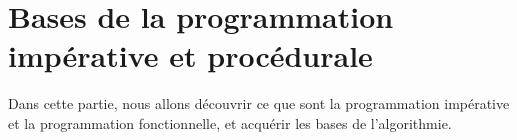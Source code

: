 \part{Bases de la programmation impérative et procédurale}

Dans cette partie, nous allons découvrir ce que sont
la programmation impérative et la programmation fonctionnelle,
et acquérir les bases de l’algorithmie.











